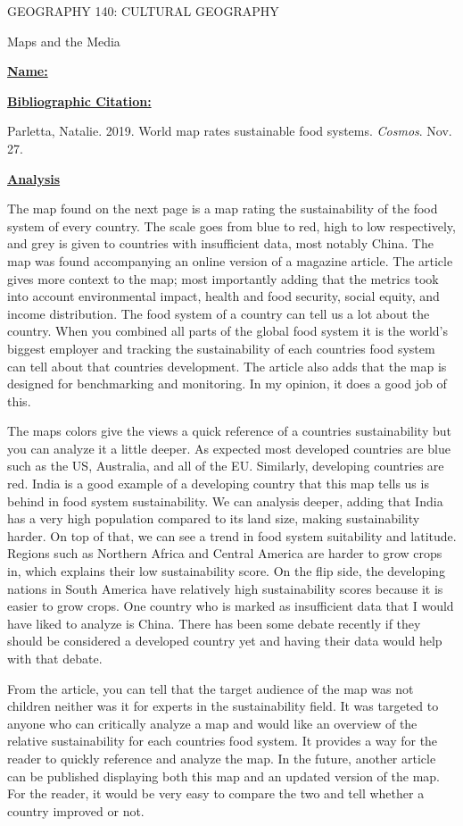 \documentclass{article}
\author{Ryan Bruno}
\date{\today}
\renewcommand{\maketitle}{

\begin{center}
\setlength{\parskip}{0em}
GEOGRAPHY 140:  CULTURAL GEOGRAPHY

Maps and the Media
\end{center}
\textbf{\underline{Name:}}
\theauthor

\textbf{\underline{Bibliographic Citation:}}

\setlength{\parindent}{10ex}
Parletta, Natalie. 2019. World map rates sustainable food systems. \textit{Cosmos}. Nov. 27.
\setlength{\parindent}{0ex}
}
\begin{document}
\maketitle

\textbf{\underline{Analysis}}

\setlength{\parindent}{10ex}
The map found on the next page is a map rating the sustainability of the food system of every country. The scale goes from blue to red, high to low respectively, and grey is given to countries with insufficient data, most notably China. The map was found accompanying an online version of a magazine article. The article gives more context to the map; most importantly adding that the metrics took into account environmental impact, health and food security, social equity, and income distribution. The food system of a country can tell us a lot about the country. When you combined all parts of the global food system it is the world's biggest employer and tracking the sustainability of each countries food system can tell about that countries development. The article also adds that the map is designed for benchmarking and monitoring. In my opinion, it does a good job of this.

The maps colors give the views a quick reference of a countries sustainability but you can analyze it a little deeper. As expected most developed countries are blue such as the US, Australia, and all of the EU. Similarly, developing countries are red. India is a good example of a developing country that this map tells us is behind in food system sustainability. We can analysis deeper, adding that India has a very high population compared to its land size, making sustainability harder. On top of that, we can see a trend in food system suitability and latitude. Regions such as Northern Africa and Central America are harder to grow crops in, which explains their low sustainability score. On the flip side, the developing nations in South America have relatively high sustainability scores because it is easier to grow crops. One country who is marked as insufficient data that I would have liked to analyze is China. There has been some debate recently if they should be considered a developed country yet and having their data would help with that debate.

From the article, you can tell that the target audience of the map was not children neither was it for experts in the sustainability field. It was targeted to anyone who can critically analyze a map and would like an overview of the relative sustainability for each countries food system. It provides a way for the reader to quickly reference and analyze the map. In the future, another article can be published displaying both this map and an updated version of the map. For the reader, it would be very easy to compare the two and tell whether a country improved or not. 
\end{document}
